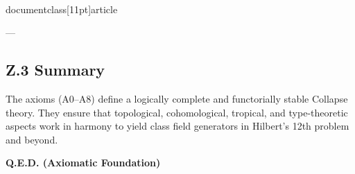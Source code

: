 \\documentclass[11pt]{article}
\begin{document}
---

\subsection*{Z.3 Summary}

The axioms (A0–A8) define a logically complete and functorially stable Collapse theory.  
They ensure that topological, cohomological, tropical, and type-theoretic aspects work in harmony  
to yield class field generators in Hilbert’s 12th problem and beyond.

\begin{center}
\LARGE \textbf{Q.E.D. (Axiomatic Foundation)}
\end{center}
\end{document}
